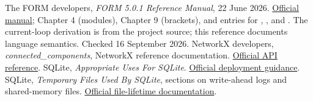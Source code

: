  The FORM developers,
\emph{FORM 5.0.1 Reference Manual}, 22 June 2026.
\href{https://form-dev.github.io/form-docs/stable/manual/}{Official manual};
Chapter 4 (modules), Chapter 9 (brackets), and entries for
, ,  and .
The current-loop derivation is from the project source; this reference
documents language semantics. Checked 16 September 2026.
 NetworkX developers,
\emph{connected\_components}, NetworkX reference documentation.
\href{https://networkx.org/documentation/stable/reference/algorithms/generated/networkx.algorithms.components.connected_components.html}{Official API reference}.
 SQLite, \emph{Appropriate Uses For SQLite}.
\href{https://www.sqlite.org/whentouse.html}{Official deployment guidance}.
 SQLite, \emph{Temporary Files Used By SQLite},
sections on write-ahead logs and shared-memory files.
\href{https://www.sqlite.org/tempfiles.html}{Official file-lifetime documentation}.
